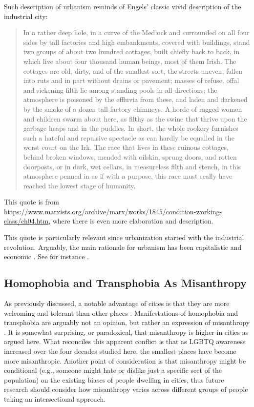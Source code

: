 \documentclass[11pt, letterpaper]{article}
\begin{document}
\begin{spacing}{1.4}
Such description of urbanism reminds of Engels' classic vivid description of the industrial city:

\begin{quote}
  In a rather deep hole, in a curve of the Medlock and surrounded on all four
  sides by tall factories and high embankments, covered with buildings, stand
  two groups of about two hundred cottages, built chiefly back to back, in which
  live about four thousand human beings, most of them Irish. The cottages are
  old, dirty, and of the smallest sort, the streets uneven, fallen into ruts and
  in part without drains or pavement; masses of refuse, offal and sickening
  filth lie among standing pools in all directions; the atmosphere is poisoned
  by the effluvia from these, and laden and darkened by the smoke of a dozen
  tall factory chimneys. A horde of ragged women and children swarm about here,
  as filthy as the swine that thrive upon the garbage heaps and in the
  puddles. In short, the whole rookery furnishes such a hateful and repulsive
  spectacle as can hardly be equalled in the worst court on the Irk. The race
  that lives in these ruinous cottages, behind broken windows, mended with
  oilskin, sprung doors, and rotten doorposts, or in dark, wet cellars, in
  measureless filth and stench, in this atmosphere penned in as if with a
  purpose, this race must really have reached the lowest stage of humanity.
\end{quote}

This quote is from
 \url{https://www.marxists.org/archive/marx/works/1845/condition-working-class/ch04.htm},
 where there is even more elaboration and description.
  
This quote is particularly relevant since urbanization started with the industrial revolution. Arguably, the main rationale for urbanism has been capitalistic and economic \citep{osullivan09,glaeser11}. See for instance \citet{harvey12,aokCityBook15,molotch76}.

\subsection{Homophobia and Transphobia As Misanthropy}

As previously discussed, a notable advantage of cities is that they are more welcoming and tolerant than other places \citep{park84,tuch87,wirth38,stephan82,aok20}. Manifestations of homophobia and transphobia are arguably not an opinion, but rather an expression of misanthropy \citep{lehmannMISC22jun6}. 
It is somewhat surprising, or paradoxical, that misanthropy is higher in cities as
argued here.  What reconciles this apparent conflict is that as LGBTQ awareness increased over the four decades studied here, the smallest places have become more misanthropic. Another point of consideration is that misanthropy might be conditional (e.g., someone might hate or dislike just a specific sect of the population) on the existing biases of people dwelling in cities, thus future research should consider how misanthropy varies across different groups of people taking an intersectional approach. 


\end{spacing}
\end{document}
